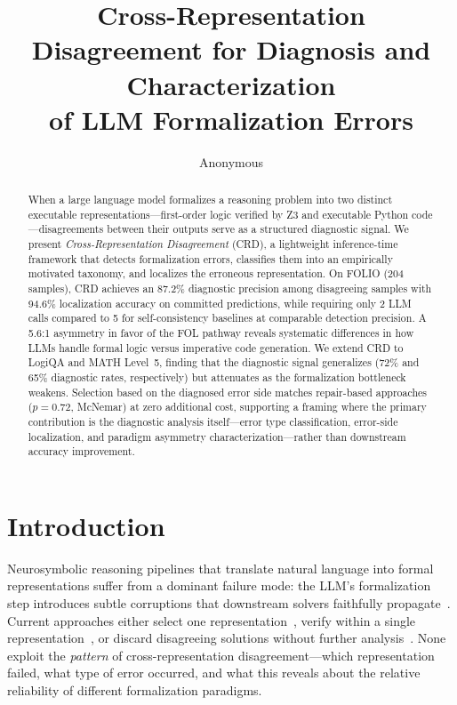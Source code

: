 \documentclass[11pt,a4paper]{article}
\title{Cross-Representation Disagreement for Diagnosis and Characterization\\of LLM Formalization Errors}
\author{Anonymous}
\newcommand{\method}{CRD}
\begin{document}
\maketitle

\begin{abstract}
When a large language model formalizes a reasoning problem into two distinct executable representations---first-order logic verified by Z3 and executable Python code---disagreements between their outputs serve as a structured diagnostic signal.
We present \emph{Cross-Representation Disagreement} (\method{}), a lightweight inference-time framework that detects formalization errors, classifies them into an empirically motivated taxonomy, and localizes the erroneous representation.
On FOLIO (204 samples), \method{} achieves an 87.2\% diagnostic precision among disagreeing samples with 94.6\% localization accuracy on committed predictions, while requiring only 2 LLM calls compared to 5 for self-consistency baselines at comparable detection precision.
A 5.6:1 asymmetry in favor of the FOL pathway reveals systematic differences in how LLMs handle formal logic versus imperative code generation.
We extend \method{} to LogiQA and MATH Level~5, finding that the diagnostic signal generalizes (72\% and 65\% diagnostic rates, respectively) but attenuates as the formalization bottleneck weakens.
Selection based on the diagnosed error side matches repair-based approaches ($p{=}0.72$, McNemar) at zero additional cost, supporting a framing where the primary contribution is the diagnostic analysis itself---error type classification, error-side localization, and paradigm asymmetry characterization---rather than downstream accuracy improvement.
\end{abstract}

\section{Introduction}

Neurosymbolic reasoning pipelines that translate natural language into formal representations suffer from a dominant failure mode: the LLM's formalization step introduces subtle corruptions that downstream solvers faithfully propagate~\cite{pan2023logic,olausson2023linc}.
Current approaches either select one representation~\cite{hybrid2024}, verify within a single representation~\cite{vericot2024,roundtrip2026}, or discard disagreeing solutions without further analysis~\cite{liang2024}.
None exploit the \emph{pattern} of cross-representation disagreement---which representation failed, what type of error occurred, and what this reveals about the relative reliability of different formalization paradigms.
\end{document}
